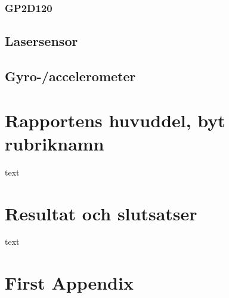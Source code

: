 \documentclass[11pt]{article}
\begin{document}
\begin{flushleft}
\subsubsection{GP2D120}

\subsection{Lasersensor}

\subsection{Gyro-/accelerometer}

\pagebreak
\section{Rapportens huvuddel, byt rubriknamn}
text

\section{Resultat och slutsatser}
text

\pagebreak
{}



\pagebreak
\appendix
\section{First Appendix}

\end{flushleft}
\end{document}

